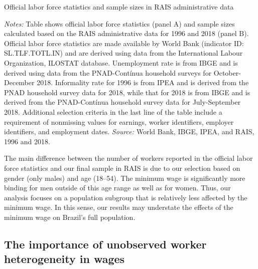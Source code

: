 \begin{table}[!htb]
  \centering
  \caption{Official labor force statistics and sample sizes in RAIS administrative data\label{tab:sample_sizes}}
  \pretabvspace
  
  \posttabvspace
  \begin{minipage}[t]{1\columnwidth}%
    \begin{spacing}{0.75}
      \emph{\scriptsize{}Notes:}{\scriptsize{} Table shows official labor force statistics (panel A) and sample sizes calculated based on the RAIS administrative data for 1996 and 2018 (panel B). Official labor force statistics are made available by World Bank (indicator ID: SL.TLF.TOTL.IN) and are derived using data from the International Labour Organization, ILOSTAT database. Unemployment rate is from IBGE and is derived using data from the PNAD-Cont{\'{i}}nua household surveys for October-December 2018. Informality rate for 1996 is from IPEA and is derived from the PNAD household survey data for 2018, while that for 2018 is from IBGE and is derived from the PNAD-Cont{\'{i}}nua household survey data for July-September 2018. Additional selection criteria in the last line of the table include a requirement of nonmissing values for earnings, worker identifiers, employer identifiers, and employment dates.
      \emph{\scriptsize{}Source:} World Bank, IBGE, IPEA, and RAIS, 1996 and 2018.}
    \end{spacing}
  \end{minipage}
\end{table}


The main difference between the number of workers reported in the official labor force statistics and our final sample in RAIS is due to our selection based on gender (only males) and age (18--54). The minimum wage is significantly more binding for men outside of this age range as well as for women. Thus, our analysis focuses on a population subgroup that is relatively less affected by the minimum wage. In this sense, our results may understate the effects of the minimum wage on Brazil's full population.




\clearpage
\subsection{The importance of unobserved worker heterogeneity in wages\label{app_subsec:unobserved_heterogeneity}}

